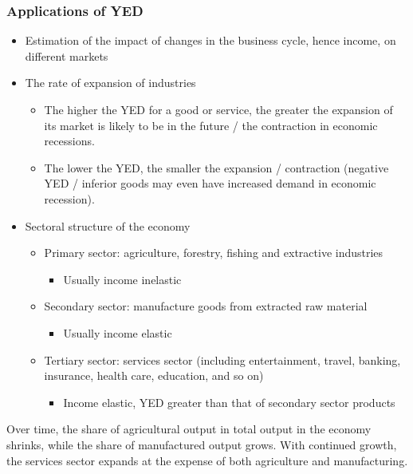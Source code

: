 \subsubsection*{Applications of YED}
\begin{itemize}
    \item Estimation of the impact of changes in the business cycle, hence income, on different markets
  \item The rate of expansion of industries
  \begin{itemize}
    \item The higher the YED for a good or service, the greater the expansion of its market is likely to be in the future / the contraction in economic recessions.
    \item The lower the YED, the smaller the expansion / contraction (negative YED / inferior goods may even have increased demand in economic recession).
  \end{itemize}
  \item Sectoral structure of the economy
  \begin{itemize}
      \item Primary sector: agriculture, forestry, fishing and extractive industries
      \begin{itemize}
        \item Usually income inelastic
      \end{itemize}
      \item Secondary sector: manufacture goods from extracted raw material
      \begin{itemize}
        \item Usually income elastic
      \end{itemize}
      \item Tertiary sector: services sector (including entertainment, travel, banking, insurance, health care, education, and so on)
      \begin{itemize}
        \item Income elastic, YED greater than that of secondary sector products
      \end{itemize}
  \end{itemize}
\end{itemize}
Over time, the share of agricultural output in total output in the economy shrinks, while the share of manufactured output grows. With continued growth, the services sector expands at the expense of both agriculture and manufacturing.
